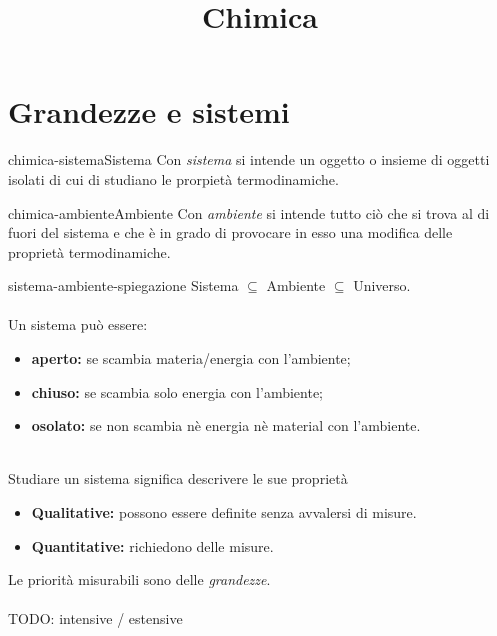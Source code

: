\documentclass[preview]{standalone}
\begin{document}
\title{Chimica}
\genpage

\section{Grandezze e sistemi}

\begin{snippetdefinition}{chimica-sistema}{Sistema}
    Con \textit{sistema}
    si intende un oggetto o insieme di oggetti isolati
    di cui di studiano le prorpietà termodinamiche.
\end{snippetdefinition}

\begin{snippetdefinition}{chimica-ambiente}{Ambiente}
    Con \textit{ambiente} si intende tutto ciò che si
    trova al di fuori del sistema e che è in grado
    di provocare in esso una modifica delle proprietà
    termodinamiche.
\end{snippetdefinition}

\begin{snippet}{sistema-ambiente-spiegazione}
Sistema \(\subseteq\) Ambiente \(\subseteq\) Universo.
\\\\
Un sistema può essere:
\begin{itemize}
    \item \textbf{aperto:} se scambia materia/energia con l'ambiente;
    \item \textbf{chiuso:} se scambia solo energia con l'ambiente;
    \item \textbf{osolato:} se non scambia nè energia nè material con l'ambiente.
\end{itemize}
\phantom{}\\
Studiare un sistema significa descrivere le sue proprietà
\begin{itemize}
    \item \textbf{Qualitative:} possono essere definite senza avvalersi
    di misure.
    \item \textbf{Quantitative:} richiedono delle misure.
\end{itemize}
Le priorità misurabili sono delle \textit{grandezze}.
\\\\
TODO: intensive / estensive
\end{snippet}
\end{document}
